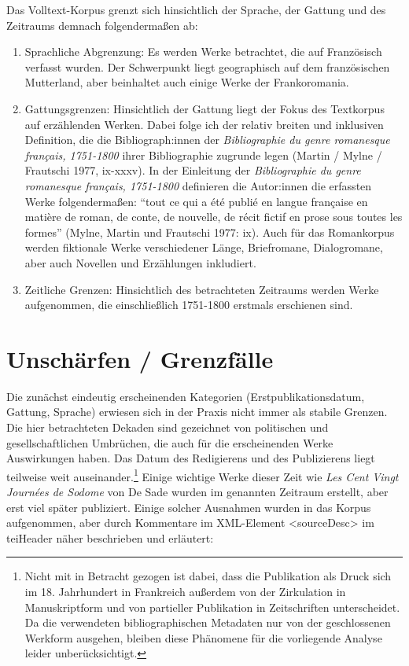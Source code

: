 \documentclass[
  12pt,
  letterpaper,
  DIV=11,
  numbers=noendperiod]{scrreprt}
\begin{document}
Das Volltext-Korpus grenzt sich hinsichtlich der Sprache, der Gattung
und des Zeitraums demnach folgendermaßen ab:

\begin{enumerate}
\def\labelenumi{(\arabic{enumi})}
\item
  Sprachliche Abgrenzung: Es werden Werke betrachtet, die auf
  Französisch verfasst wurden. Der Schwerpunkt liegt geographisch auf
  dem französischen Mutterland, aber beinhaltet auch einige Werke der
  Frankoromania.\\
\item
  Gattungsgrenzen: Hinsichtlich der Gattung liegt der Fokus des
  Textkorpus auf erzählenden Werken. Dabei folge ich der relativ breiten
  und inklusiven Definition, die die Bibliograph:innen der
  \emph{Bibliographie du genre romanesque français, 1751-1800} ihrer
  Bibliographie zugrunde legen (Martin / Mylne / Frautschi 1977,
  ix-xxxv). In der Einleitung der \emph{Bibliographie du genre
  romanesque français, 1751-1800} definieren die Autor:innen die
  erfassten Werke folgendermaßen: ``tout ce qui a été publié en langue
  française en matière de roman, de conte, de nouvelle, de récit fictif
  en prose sous toutes les formes'' (Mylne, Martin und Frautschi 1977:
  ix). Auch für das Romankorpus werden fiktionale Werke verschiedener
  Länge, Briefromane, Dialogromane, aber auch Novellen und Erzählungen
  inkludiert.
\item
  Zeitliche Grenzen: Hinsichtlich des betrachteten Zeitraums werden
  Werke aufgenommen, die einschließlich 1751-1800 erstmals erschienen
  sind.
\end{enumerate}

\section{Unschärfen / Grenzfälle}\label{unschuxe4rfen-grenzfuxe4lle}

Die zunächst eindeutig erscheinenden Kategorien (Erstpublikationsdatum,
Gattung, Sprache) erwiesen sich in der Praxis nicht immer als stabile
Grenzen. Die hier betrachteten Dekaden sind gezeichnet von politischen
und gesellschaftlichen Umbrüchen, die auch für die erscheinenden Werke
Auswirkungen haben. Das Datum des Redigierens und des Publizierens liegt
teilweise weit auseinander.\footnote{Nicht mit in Betracht gezogen ist
  dabei, dass die Publikation als Druck sich im 18. Jahrhundert in
  Frankreich außerdem von der Zirkulation in Manuskriptform und von
  partieller Publikation in Zeitschriften unterscheidet. Da die
  verwendeten bibliographischen Metadaten nur von der geschlossenen
  Werkform ausgehen, bleiben diese Phänomene für die vorliegende Analyse
  leider unberücksichtigt.} Einige wichtige Werke dieser Zeit wie
\emph{Les Cent Vingt Journées de Sodome} von De Sade wurden im genannten
Zeitraum erstellt, aber erst viel später publiziert. Einige solcher
Ausnahmen wurden in das Korpus aufgenommen, aber durch Kommentare im
XML-Element \textless sourceDesc\textgreater{} im teiHeader näher
beschrieben und erläutert:
\end{document}
